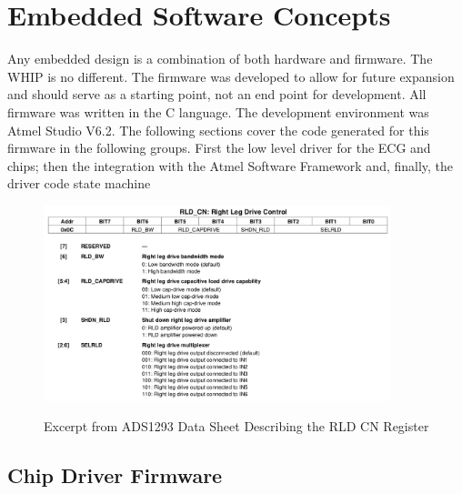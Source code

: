 \chapter{Embedded Software Concepts}
\label{chap:SensorConcepts}
Any embedded design is a combination of both hardware and firmware. The WHIP is no different. The firmware was developed to allow for future expansion and should serve as a starting point, not an end point for development. All firmware was written in the C language. The development environment was Atmel Studio V6.2\cite{AtmelStudio}. The following sections cover the code generated for this firmware in the following groups. First the low level driver for the ECG and  chips; then the integration with the Atmel Software Framework and, finally, the driver code state machine

\begin{figure}
	\begin{center}
		\label{fig:ADS1293_RLD_CN}
		\includegraphics[scale=1,width=0.9\textwidth]{Images/ADS1293_RLD_CN_modified.png} 
		\caption{Excerpt from ADS1293 Data Sheet Describing the RLD CN Register}
	\end{center}
\end{figure}

\section{Chip Driver Firmware}

